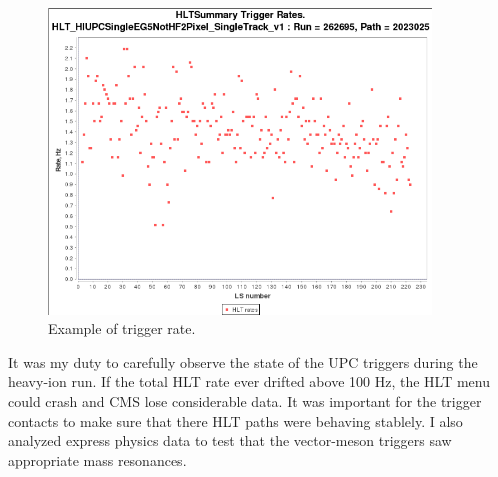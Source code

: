 \begin{figure}[h!]
\begin{centering}
\includegraphics[width=4in]{Chapter5/importfigs/triggerRateExample.png}
\par\end{centering}
\caption{Example of trigger rate. \label{fig:trigRate}}
\end{figure}

It was my duty to carefully observe the state of the UPC triggers during the heavy-ion run. If the total HLT rate ever drifted above 100 Hz, the HLT menu could crash and CMS lose considerable data. It was important for the trigger contacts to make sure that there HLT paths were behaving stablely. I also analyzed express physics data to test that the vector-meson triggers saw appropriate mass resonances.

